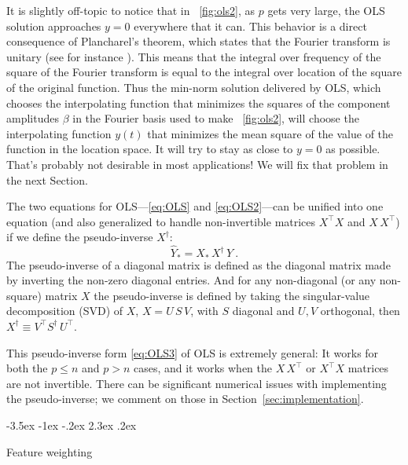 \documentclass[12pt,letterpaper]{article}
\makeatletter
\renewcommand\section{\@startsection {section}{1}{\z@}%
  {-3.5ex \@plus -1ex \@minus -.2ex}%
  {2.3ex \@plus.2ex}%
  {\raggedright\normalfont\Large\bfseries}}
\newcommand{\sectionname}{Section}
\makeatother
\begin{document}
It is slightly off-topic to notice that in \figurename~\ref{fig:ols2}, as $p$ gets very large, the OLS solution approaches $y=0$ everywhere that it can.
This behavior is a direct consequence of Plancharel's theorem, which states that the Fourier transform is unitary (see for instance \citealt{folland2016course}).
This means that the integral over frequency of the square of the Fourier transform is equal to the integral over location of the square of the original function.
Thus the min-norm solution delivered by OLS, which chooses the interpolating function that minimizes the squares of the component amplitudes $\beta$ in the Fourier basis used to make \figurename~\ref{fig:ols2}, will choose the interpolating function $y(t)$ that minimizes the mean square of the value of the function in the location space.
It will try to stay as close to $y=0$ as possible.
That's probably not desirable in most applications! We will fix that problem in the next \sectionname.

The two equations for OLS---\eqref{eq:OLS} and \eqref{eq:OLS2}---can be unified into one equation (and also generalized to handle non-invertible matrices $X^\top X$ and $X\,X^\top$) if we define the pseudo-inverse $X^\dagger$:
\begin{equation}\label{eq:OLS3}
    \hat{Y}_\ast = X_\ast\,X^\dagger\,Y
    ~.
\end{equation}
The pseudo-inverse of a diagonal matrix is defined as the diagonal matrix made by inverting the non-zero diagonal entries. And for any non-diagonal (or any non-square) matrix $X$ the pseudo-inverse is defined by taking the singular-value decomposition (SVD) of $X$, $X=U\,S\,V$, with $S$ diagonal and $U,V$ orthogonal, then $X^\dagger \equiv V^\top S^\dagger\,U^\top$.

This pseudo-inverse form \eqref{eq:OLS3} of OLS is extremely general: It works for both the $p\le n$ and $p>n$ cases, and it works when the $X\,X^\top$ or $X^\top X$ matrices are not invertible.
There can be significant numerical issues with implementing the pseudo-inverse; we comment on those in \sectionname~\ref{sec:implementation}.

\section{Feature weighting}\label{sec:fwols}
\end{document}
